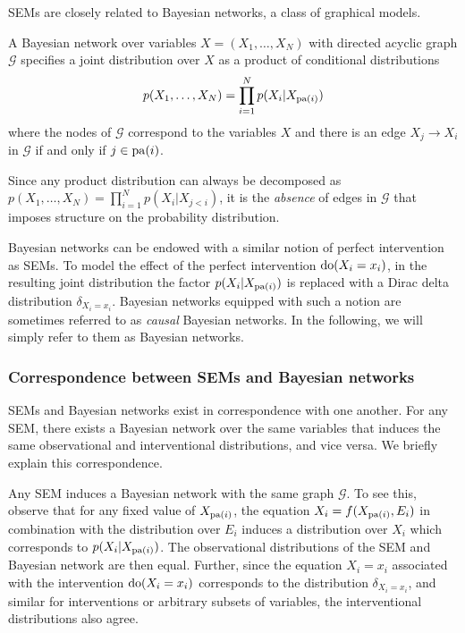 SEMs are closely related to Bayesian networks, a class of graphical models.

\medskip

\begin{definition}
A Bayesian network over variables $X = (X_1,\ldots, X_N)$ with directed acyclic graph $\mathcal{G}$ specifies a joint distribution over $X$ as a product of conditional distributions
\begin{align*}
	p(X_1,\ldots,X_N) = \prod_{i=1}^N p(X_i | X_{\operatorname{pa}(i)})
\end{align*}
where the nodes of $\mathcal{G}$ correspond to the variables $X$ and there is an edge $X_j \to X_i$ in $\mathcal{G}$ if and only if $j \in \operatorname{pa}(i)$.
\end{definition}

Since any product distribution can always be decomposed as $p(X_1,\ldots,X_N) = \prod_{i=1}^N p(X_i | X_{j<i})$, it is the \emph{absence} of edges in $\mathcal{G}$ that imposes structure on the probability distribution.

Bayesian networks can be endowed with a similar notion of perfect intervention as SEMs. To model the effect of the perfect intervention $\operatorname{do}(X_i = x_i)$, in the resulting joint distribution the factor $p(X_i | X_{\operatorname{pa}(i)})$ is replaced with a Dirac delta distribution $\delta_{X_i = x_i}$. 
Bayesian networks equipped with such a notion are sometimes referred to as \emph{causal} Bayesian networks. 
In the following, we will simply refer to them as Bayesian networks.


\subsubsection{Correspondence between SEMs and Bayesian networks} 
SEMs and Bayesian networks exist in correspondence with one another. 
For any SEM, there exists a Bayesian network over the same variables that induces the same observational and interventional distributions, and vice versa.
We briefly explain this correspondence.

Any SEM induces a Bayesian network with the same graph $\mathcal{G}$.
To see this, observe that for any fixed value of $X_{\operatorname{pa}(i)}$, the equation $X_i = f(X_{\operatorname{pa}(i)} , E_i)$ in combination with the distribution over $E_i$ induces a distribution over $X_i$ which corresponds to $p(X_i | X_{\operatorname{pa}(i)})$. The observational distributions of the SEM and Bayesian network are then equal. Further, since the equation $X_i=x_i$ associated with the intervention $\operatorname{do}(X_i = x_i)$ corresponds to the distribution $\delta_{X_i = x_i}$, and similar for interventions or arbitrary subsets of variables, the interventional distributions also agree.

